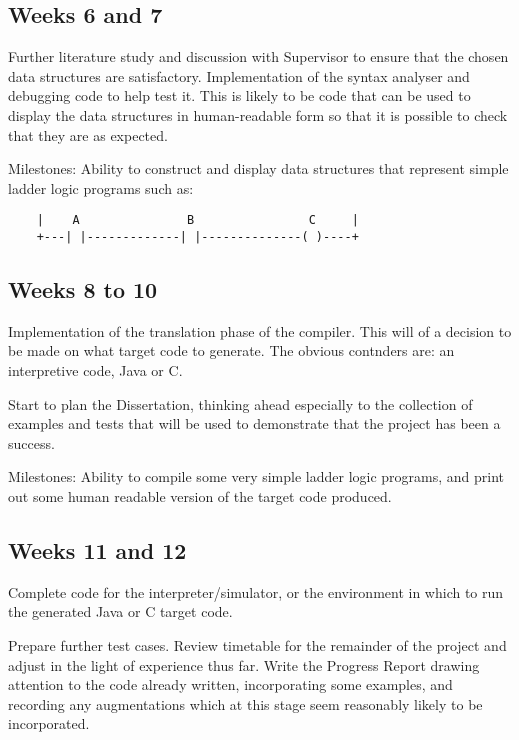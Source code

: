 \documentclass[12pt]{article}
\begin{document}
\subsection*{Weeks 6 and 7}

Further literature study and discussion with Supervisor to ensure that
the chosen data structures are satisfactory.  Implementation of the
syntax analyser and debugging code to help test it.  This is likely to
be code that can be used to display the data structures in
human-readable form so that it is possible to check that they are as
expected.

Milestones: Ability to construct and display data structures that
represent simple ladder logic programs such as:

\begin{verbatim}
    |    A               B                C     |
    +---| |-------------| |--------------( )----+
\end{verbatim}


\subsection*{Weeks 8 to 10}

Implementation of the translation phase of the compiler. This will of
a decision to be made on what target code to generate. The obvious contnders
are: an interpretive code, Java or C.

Start to plan the Dissertation, thinking ahead especially to the
collection of examples and tests that will be used to demonstrate that
the project has been a success. 

Milestones: Ability to compile some very simple ladder logic programs,
and print out some human readable version of the target code produced.


\subsection*{Weeks 11 and 12}

Complete code for the interpreter/simulator, or the environment in
which to run the generated Java or C target code.

Prepare further test cases.  Review timetable for the remainder of the
project and adjust in the light of experience thus far.  Write the
Progress Report drawing attention to the code already written,
incorporating some examples, and recording any augmentations which at
this stage seem reasonably likely to be incorporated.
\end{document}
